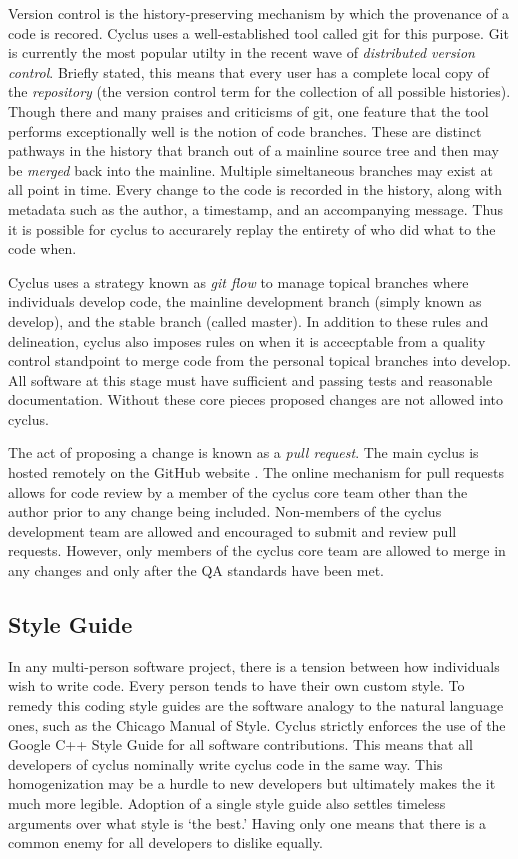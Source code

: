 Version control is the history-preserving mechanism by which the provenance of 
a code is recored. Cyclus uses a well-established tool called git \cite{git_2014}
for this purpose. Git is currently the most popular utilty in the recent wave
of \emph{distributed version control}. Briefly stated, this means that every 
user has a complete local copy of the \emph{repository} (the version control
term for the collection of all possible histories).
Though there and many praises and criticisms of git, one 
feature that the tool performs exceptionally well is the notion of code branches.
These are distinct pathways in the history that branch out of a mainline source
tree and then may be \emph{merged} back into the mainline. Multiple simeltaneous
branches may exist at all point in time. Every change to the code is recorded
in the history, along with metadata such as the author, a timestamp, and an 
accompanying message. Thus 
it is possible for cyclus to accurarely replay the entirety of who did what to the
code when.

Cyclus uses a strategy known as \emph{git flow} \cite{kalliamvakou2014code} 
to manage topical branches where individuals develop code, the mainline development
branch (simply known as develop), and the stable branch (called master).
In addition to these rules and delineation, cyclus also imposes rules on 
when it is accecptable from a quality control standpoint to merge code from 
the personal topical branches into develop. All software at this stage 
must have sufficient and passing tests and reasonable documentation. Without
these core pieces proposed changes are not allowed into cyclus.

The act of proposing a change is known as a \emph{pull request}. The main cyclus is 
hosted remotely on the GitHub website \cite{dabbish2012social}. The online
mechanism for pull requests allows for code review by a member of the cyclus 
core team other than the author prior to any change being included. Non-members
of the cyclus development team are allowed and encouraged to submit and review 
pull requests. However, only members of the cyclus core team are allowed to 
merge in any changes and only after the QA standards have been met.

\subsection{Style Guide}

In any multi-person software project, there is a tension between how individuals
wish to write code. Every person tends to have their own custom style. To remedy this
coding style guides are the software analogy to the natural language ones, 
such as the Chicago Manual of Style. Cyclus strictly enforces the use of the 
Google C++ Style Guide \cite{weinberger2008google} for all software contributions.
This means that all developers of cyclus nominally write cyclus code in the same 
way.  This homogenization may be a hurdle to new developers but ultimately 
makes the it much more legible. Adoption of a single style guide also settles
timeless arguments over what style is `the best.' Having only one means that 
there is a common enemy for all developers to dislike equally.

